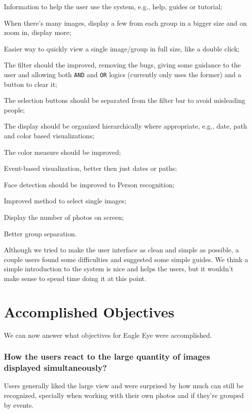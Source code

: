 \begin{myitemize}
	\item Information to help the user use the system, e.g., help, guides or tutorial;
	\item When there's many images, display a few from each group in a bigger size and on zoom in, display more;
	\item Easier way to quickly view a single image/group in full size, like a double click;
	\item The filter should the improved, removing the bugs, giving some guidance to the user and allowing both \texttt{AND} and \texttt{OR} logics (currently only uses the former) and a button to clear it;
	\item The selection buttons should be separated from the filter bar to avoid misleading people;
	\item The display should be organized hierarchically where appropriate, e.g., date, path and color based visualizations;
	\item The color measure should be improved;
	\item Event-based visualization, better then just dates or paths;
	\item Face detection should be improved to Person recognition;
	\item Improved method to select single images;
	\item Display the number of photos on screen;
	\item Better group separation.
\end{myitemize}

Although we tried to make the user interface as clean and simple as possible, a couple users found some difficulties and suggested some simple guides. We think a simple introduction to the system is nice and helps the users, but it wouldn't make sense to spend time doing it at this point.

\pagebreak




\section{Accomplished Objectives} 

We can now answer what objectives for Eagle Eye were accomplished. 




\subsubsection{How the users react to the large quantity of images displayed simultaneously?}
Users generally liked the large view and were surprised by how much can still be recognized, specially when working with their own photos and if they're grouped by events. 




